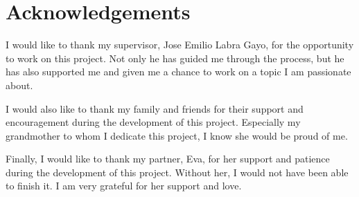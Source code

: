\phantom{~}

\vfill

\begingroup

\section*{Acknowledgements}

\noindent I would like to thank my supervisor, Jose Emilio Labra Gayo, for the opportunity to work on this project. Not only he has guided me through the process, but he has also supported me and given me a chance to work on a topic I am passionate about.

\noindent I would also like to thank my family and friends for their support and encouragement during the development of this project. Especially my grandmother to whom I dedicate this project, I know she would be proud of me.

\noindent Finally, I would like to thank my partner, Eva, for her support and patience during the development of this project. Without her, I would not have been able to finish it. I am very grateful for her support and love.

\endgroup

\vfill
